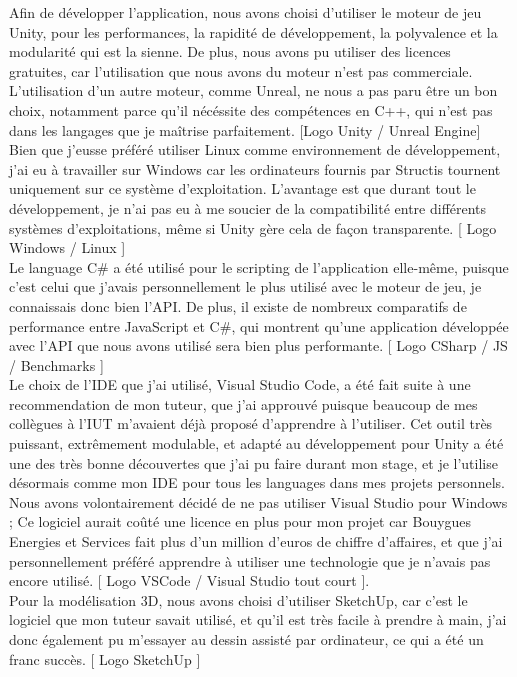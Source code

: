 \documentclass[a4paper]{article}
\begin{document}
    Afin de développer l'application, nous avons choisi d'utiliser le moteur de jeu Unity, pour les performances, la rapidité de développement, la polyvalence et la modularité qui est la sienne. De plus, nous avons pu utiliser des licences gratuites, car l'utilisation que nous avons du moteur n'est pas commerciale. L'utilisation d'un autre moteur, comme Unreal, ne nous a pas paru être un bon choix, notamment parce qu'il nécéssite des compétences en C++, qui n'est pas dans les langages que je maîtrise parfaitement. [Logo Unity / Unreal Engine] \\

    Bien que j'eusse préféré utiliser Linux comme environnement de développement, j'ai eu à travailler sur Windows car les ordinateurs fournis par Structis tournent uniquement sur ce système d'exploitation. L'avantage est que durant tout le développement, je n'ai pas eu à me soucier de la compatibilité entre différents systèmes d'exploitations, même si Unity gère cela de façon transparente. [ Logo Windows / Linux ] \\
    
    Le language C\# a été utilisé pour le scripting de l'application elle-même, puisque c'est celui que j'avais personnellement le plus utilisé avec le moteur de jeu, je connaissais donc bien l'API. De plus, il existe de nombreux comparatifs de performance entre JavaScript et C\#, qui montrent qu'une application développée avec l'API que nous avons utilisé sera bien plus performante. [ Logo CSharp / JS / Benchmarks ] \\

    Le choix de l'IDE que j'ai utilisé, Visual Studio Code, a été fait suite à une recommendation de mon tuteur, que j'ai approuvé puisque beaucoup de mes collègues à l'IUT m'avaient déjà proposé d'apprendre à l'utiliser. Cet outil très puissant, extrêmement modulable, et adapté au développement pour Unity a été une des très bonne découvertes que j'ai pu faire durant mon stage, et je l'utilise désormais comme mon IDE pour tous les languages dans mes projets personnels. Nous avons volontairement décidé de ne pas utiliser Visual Studio pour Windows ; Ce logiciel aurait coûté une licence en plus pour mon projet car Bouygues Energies et Services fait plus d'un million d'euros de chiffre d'affaires, et que j'ai personnellement préféré apprendre à utiliser une technologie que je n'avais pas encore utilisé. [ Logo VSCode / Visual Studio tout court ].\\

    Pour la modélisation 3D, nous avons choisi d'utiliser SketchUp, car c'est le logiciel que mon tuteur savait utilisé, et qu'il est très facile à prendre à main, j'ai donc également pu m'essayer au dessin assisté par ordinateur, ce qui a été un franc succès. [ Logo SketchUp ] \\
\end{document}
